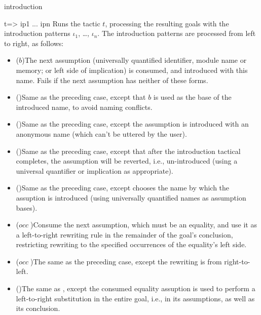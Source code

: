 \begin{tactic}[$t$ =>$\;\iota_1 \cdots \iota_n$]{introduction}
  \begin{tsyntax}[empty]{t=> ip1 ... ipn}
    Runs the tactic $t$, processing the resulting goals with the
    introduction patterns $\iota_1$, \ldots, $\iota_n$. The introduction
    patterns are processed from left to right, as follows:
    \begin{itemize}
    \item ($b$)\quad The next assumption (universally quantified
      identifier, module name or memory; or left side of implication)
      is consumed, and introduced with this name. Fails if the next
      assumption has neither of these forms.

    \item ()\quad Same as the preceding case, except that
      $b$ is used as the base of the introduced name, to avoid naming
      conflicts.

    \item (\ec{_})\quad Same as the preceding case, except the
      assumption is introduced with an anonymous name (which can't be
      uttered by the user).

    \item (\ec{+})\quad Same as the preceding case, except that after
      the introduction tactical completes, the assumption will be
      reverted, i.e., un-introduced (using a universal quantifier or
      implication as appropriate).

    \item ()\quad Same as the preceding case, except \EasyCrypt
      chooses the name by which the assuption is introduced (using
      universally quantified names as assumption bases).

    \item ($\mathit{occ}\;$\ec{->})\quad Consume the next assumption,
      which must be an equality, and use it as a left-to-right rewriting
      rule in the remainder of the goal's conclusion, restricting rewriting
      to the specified occurrences of the equality's left side.

    \item ($\mathit{occ}\;$\ec{<-})\quad The same as the preceding case,
      except the rewriting is from right-to-left.

    \item (\ec{->>})\quad The same as \ec{->}, except the consumed
      equality assuption is used to perform a left-to-right substitution
      in the entire goal, i.e., in its assumptions, as well as its
      conclusion.


\end{itemize}
\end{tsyntax}
\end{tactic}
